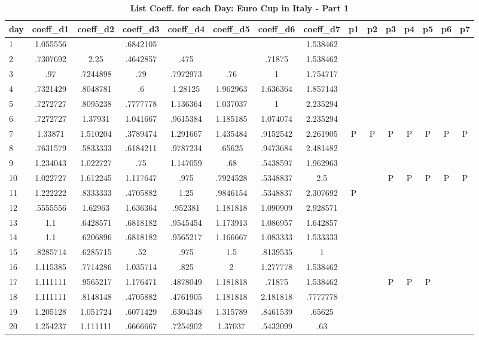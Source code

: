 \documentclass[a4paper,12pt]{article}
\begin{document}
\begin{landscape}
\begin{footnotesize}
\begin{center}
\begin{longtable}{lcccccccccccccc|}
\caption{\textbf{List Coeff. for each Day: Euro Cup in Italy - Part 1}\label{tab_it_2a}}
\hline
day&coeff\_d1&coeff\_d2&coeff\_d3&coeff\_d4&coeff\_d5&coeff\_d6&coeff\_d7&p1&p2&p3&p4&p5&p6&p7 \\ \hline
1&1.055556&&.6842105&&&&1.538462&&&&&&& \\
2&.7307692&2.25&.4642857&.475&&.71875&1.538462&&&&&&& \\
3&.97&.7244898&.79&.7972973&.76&1&1.754717&&&&&&& \\
4&.7321429&.8048781&.6&1.28125&1.962963&1.636364&1.857143&&&&&&& \\
5&.7272727&.8095238&.7777778&1.136364&1.037037&1&2.235294&&&&&&& \\
6&.7272727&1.37931&1.041667&.9615384&1.185185&1.074074&2.235294&&&&&&& \\
7&1.33871&1.510204&.3789474&1.291667&1.435484&.9152542&2.261905&P&P&P&P&P&P&P \\
8&.7631579&.5833333&.6184211&.9787234&.65625&.9473684&2.481482&&&&&&& \\
9&1.234043&1.022727&.75&1.147059&.68&.5438597&1.962963&&&&&&& \\
10&1.022727&1.612245&1.117647&.975&.7924528&.5348837&2.5&&&P&P&P&P&P \\
11&1.222222&.8333333&.4705882&1.25&.9846154&.5348837&2.307692&P&&&&&& \\
12&.5555556&1.62963&1.636364&.952381&1.181818&1.090909&2.928571&&&&&&& \\
13&1.1&.6428571&.6818182&.9545454&1.173913&1.086957&1.642857&&&&&&& \\
14&1.1&.6206896&.6818182&.9565217&1.166667&1.083333&1.533333&&&&&&& \\
15&.8285714&.6285715&.52&.975&1.5&.8139535&1&&&&&&& \\
16&1.115385&.7714286&1.035714&.825&2&1.277778&1.538462&&&&&&& \\
17&1.111111&.9565217&1.176471&.4878049&1.181818&.71875&1.538462&&&P&P&P&& \\
18&1.111111&.8148148&.4705882&.4761905&1.181818&2.181818&.7777778&&&&&&& \\
19&1.205128&1.051724&.6071429&.6304348&1.315789&.8461539&.65625&&&&&&& \\
20&1.254237&1.111111&.6666667&.7254902&1.37037&.5432099&.63&&&&&&& \\

\end{longtable}
\end{center}
\end{footnotesize}
\end{landscape}
\end{document}
